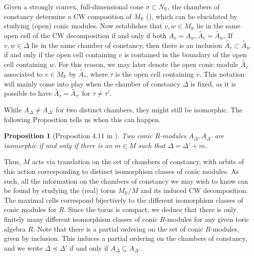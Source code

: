 \documentclass[reqno, 12pt]{amsart}
\newtheorem{proposition}[theorem]{Proposition}
\theoremstyle{definition}
\numberwithin{equation}{section}
\newcommand{\R}{\mathbb{R}}
\newcommand{\opA}{\overset{\circ}{A}}
\begin{document}
Given a strongly convex, full-dimensional cone $\sigma\subset N_\R$, the chambers of constancy determine a CW composition of $M_\R$ (\cite{Bru05}), which can be elucidated
by studying (open) conic modules. Now \cite[Corollary 4.9]{FMS19} establishes that $v,w\in M_\R$ lie in the same open cell of the CW decomposition if and only if both $A_v=A_w, \opA_v=\opA_w$. If $v,w\in \Delta$ lie in the same chamber of constancy, then there is an inclusion $\opA_v\subset \opA_w$ if and only if the open cell containing $v$ is contained in the boundary of the open cell containing $w$. For this reason, we may later denote the open conic module $\opA_v$ associated to $v\in M_\R$ by $\opA_\tau$, where $\tau$ is the open cell containing $v$. This notation will mainly come into play when the chamber of constancy $\Delta$ is fixed, as it is possible to have $\opA_\tau=\opA_{\tau'}$ for $\tau\neq \tau'$. 

While $A_\Delta\neq A_{\Delta'}$ for two distinct chambers, they might still be isomorphic. The following Proposition tells us when this can happen.
\begin{proposition}[Proposition 4.11 in \cite{FMS19}]
    \label{Prop:IsoConicModules}
    Two conic $R$-modules $A_\Delta, A_{\Delta'}$ are isomorphic if and only if there is an $m\in M$ such that $\Delta=\Delta'+m$.
\end{proposition}
Thus, $M$ acts via translation on the set of chambers of constancy, with orbits of this action corresponding to distinct isomorphism classes of conic modules. As such, all the information on the chambers of constancy we may wish to know can be found by studying the (real) torus $M_\R/M$ and its induced CW decomposition. The maximal cells correspond bijectively to the different isomorphism classes of conic modules for $R$. Since the torus is compact, we deduce that there is only finitely many different isomorphism classes of conic $R$-modules for any given toric algebra $R$. Note that there is a partial ordering on the set of conic $R$-modules, given by inclusion. This induces a partial ordering on the chambers of constancy, and we write $\Delta \preceq \Delta'$ if and only if $A_\Delta\subseteq A_{\Delta'}$.
\end{document}
